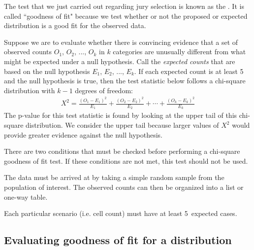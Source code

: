 The test that we just carried out regarding jury selection is known as the . It is called ``goodness of fit" because we test whether or not the proposed or expected distribution is a good fit for the observed data.

\begin{termBox}{
Suppose we are to evaluate whether there is convincing evidence that a set of observed counts $O_1$, $O_2$, ..., $O_k$ in $k$ categories are unusually different from what might be expected under a null hypothesis. Call the \emph{expected counts} that are based on the null hypothesis $E_1$, $E_2$, ..., $E_k$. If each expected count is at least 5 and the null hypothesis is true, then the test statistic below follows a chi-square distribution with $k-1$ degrees of freedom:
\begin{align*}
X^2 = \frac{(O_1 - E_1)^2}{E_1} + \frac{(O_2 - E_2)^2}{E_2} + \cdots + \frac{(O_k - E_k)^2}{E_k}
\end{align*}
The p-value for this test statistic is found by looking at the upper tail of this chi-square distribution. We consider the upper tail because larger values of $X^2$ would provide greater evidence against the null hypothesis.}
\end{termBox}

\begin{tipBox}{
There are two conditions that must be checked before performing a chi-square goodness of fit test. If these conditions are not met, this test should not be used.\vspace{-1mm}
\begin{description}
\setlength{\itemsep}{0mm}
\item[Simple random sample.] The data must be arrived at by taking a simple random sample from the population of interest. The observed counts can then be organized into a list or one-way table.
\item[All Expected Counts at least 5] Each particular scenario (i.e. cell count) must have at least 5~expected cases.
\vspace{-2mm}
\end{description}
}
\end{tipBox}


\subsection{Evaluating goodness of fit for a distribution}

